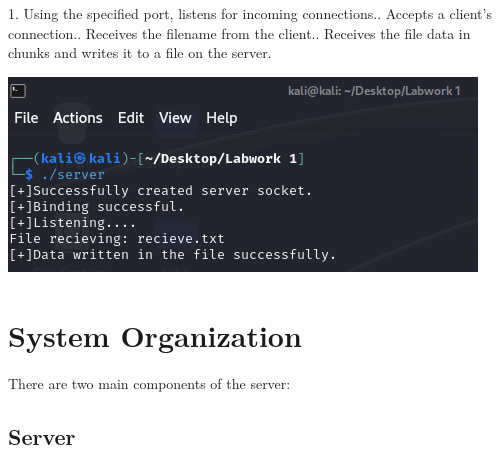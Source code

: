 \documentclass{article}
\begin{document}
1. Using the specified port, listens for incoming connections.. Accepts a client's connection.. Receives the filename from the client.. Receives the file data in chunks and writes it to a file on the server.\newline 

\includegraphics[width=1\linewidth]{server.png}

\section{System Organization}

There are two main components of the server:

\subsection{Server}
\end{document}
